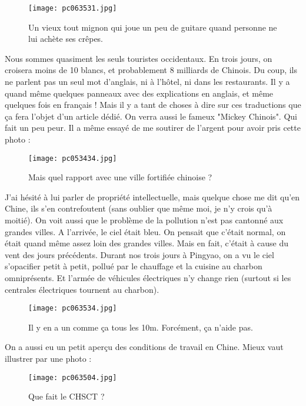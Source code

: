 \documentclass{book}
\begin{document}
\begin{figure}[H]
\centering
\texttt{[image: pc063531.jpg]}
\caption*{Un vieux tout mignon qui joue un peu de guitare quand personne ne lui achète ses crêpes.}
\end{figure}

Nous sommes quasiment les seuls touristes occidentaux. En trois jours, on croisera moins de 10 blancs, et probablement 8 milliards de Chinois. Du coup, ils ne parlent pas un seul mot d'anglais, ni à l'hôtel, ni dans les restaurants. Il y a quand même quelques panneaux avec des explications en anglais, et même quelques fois en français ! Mais il y a tant de choses à dire sur ces traductions que ça fera l'objet d'un article dédié.
On verra aussi le fameux "Mickey Chinois". Qui fait un peu peur. Il a même essayé de me soutirer de l'argent pour avoir pris cette photo :


\begin{figure}[H]
\centering
\texttt{[image: pc053434.jpg]}
\caption*{Mais quel rapport avec une ville fortifiée chinoise ?}
\end{figure}

J'ai hésité à lui parler de propriété intellectuelle, mais quelque chose me dit qu'en Chine, ils s'en contrefoutent (sans oublier que même moi, je n'y crois qu'à moitié).
On voit aussi que le problème de la pollution n'est pas cantonné aux grandes villes. A l'arrivée, le ciel était bleu. On pensait que c'était normal, on était quand même assez loin des grandes villes. Mais en fait, c'était à cause du vent des jours précédents. Durant nos trois jours à Pingyao, on a vu le ciel s’opacifier petit à petit, pollué par le chauffage et la cuisine au charbon omniprésents. Et l'armée de véhicules électriques n'y change rien (surtout si les centrales électriques tournent au charbon).


\begin{figure}[H]
\centering
\texttt{[image: pc063534.jpg]}
\caption*{Il y en a un comme ça tous les 10m. Forcément, ça n'aide pas.}
\end{figure}

On a aussi eu un petit aperçu des conditions de travail en Chine. Mieux vaut illustrer par une photo :


\begin{figure}[H]
\centering
\texttt{[image: pc063504.jpg]}
\caption*{Que fait le CHSCT ?}
\end{figure}
\end{document}
